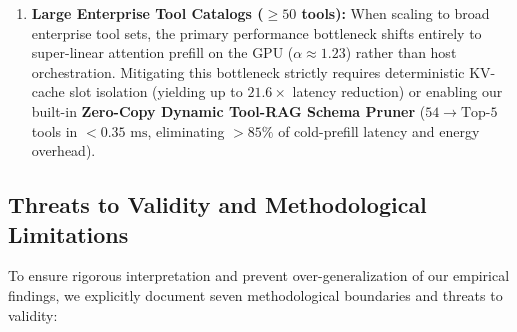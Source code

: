 \documentclass[preprint,12pt,3p]{elsarticle}
\begin{document}
\begin{enumerate}
    \item \textbf{Large Enterprise Tool Catalogs ($\ge 50$ tools):} When scaling to broad enterprise tool sets, the primary performance bottleneck shifts entirely to super-linear attention prefill on the GPU ($\alpha \approx 1.23$) rather than host orchestration. Mitigating this bottleneck strictly requires deterministic KV-cache slot isolation (yielding up to $21.6\times$ latency reduction) or enabling our built-in \textbf{Zero-Copy Dynamic Tool-RAG Schema Pruner} ($54 \rightarrow \text{Top-}5$ tools in $<0.35\text{ ms}$, eliminating $>85\%$ of cold-prefill latency and energy overhead).
\end{enumerate}

\subsection{Threats to Validity and Methodological Limitations}
\label{sec:threats_to_validity}
To ensure rigorous interpretation and prevent over-generalization of our empirical findings, we explicitly document seven methodological boundaries and threats to validity:
\end{document}
